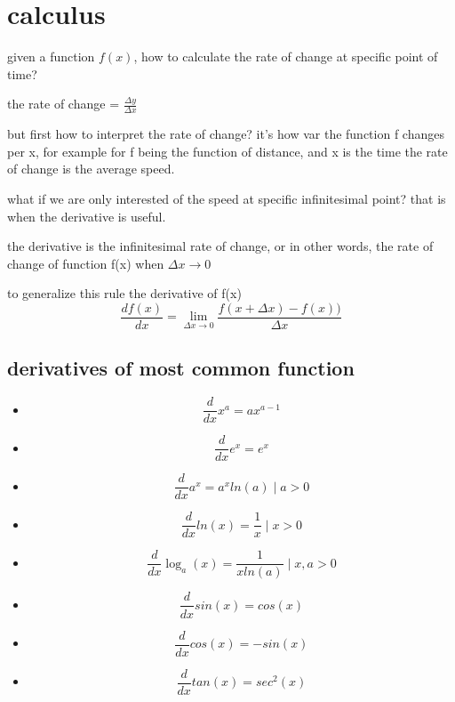 \documentclass[4apaper,12pt]{book}
\begin{document}
  \chapter{calculus}
  \begin{description}
  \item given a function $f(x)$, how to calculate the rate of change at specific point of time?
  \item the rate of change = $\frac{\Delta{y}}{\Delta{x}}$
  \item but first how to interpret the rate of change? it's how var the function f changes per x, for example for f being the function of distance, and x is the time the rate of change is the average speed.
  \item what if we are only interested of the speed at specific infinitesimal point? that is when the derivative is useful.
  \item the derivative is the infinitesimal rate of change, or in other words, the rate of change of function f(x) when $\Delta{x} \to {0}$
    \item to generalize this rule the derivative of f(x)
    \begin{equation} \frac{df(x)}{dx}=\lim_{\Delta x \to 0}\frac{f(x+\Delta{x})-f(x))}{\Delta x} \end{equation}
    \section{derivatives of most common function}
    \begin{itemize}
    \item \begin{equation} \frac{d}{dx}x^a = ax^{a-1} \end{equation}
    \item \begin{equation} \frac{d}{dx}e^x = e^x \end{equation}
    \item \begin{equation} \frac{d}{dx}a^x = a^xln(a) \mid a>0 \end{equation}
    \item \begin{equation} \frac{d}{dx}ln(x) = \frac{1}{x} \mid x>0 \end{equation}
    \item \begin{equation} \frac{d}{dx}\log_{a}(x) = \frac{1}{xln(a)} \mid x,a>0 \end{equation}
    \item \begin{equation} \frac{d}{dx} sin(x) = cos(x) \end{equation}
    \item \begin{equation} \frac{d}{dx} cos(x) = -sin(x) \end{equation}
    \item \begin{equation} \frac{d}{dx} tan(x) = sec^2(x) \end{equation}
    \end{itemize}
  \end{description}
\end{document}
